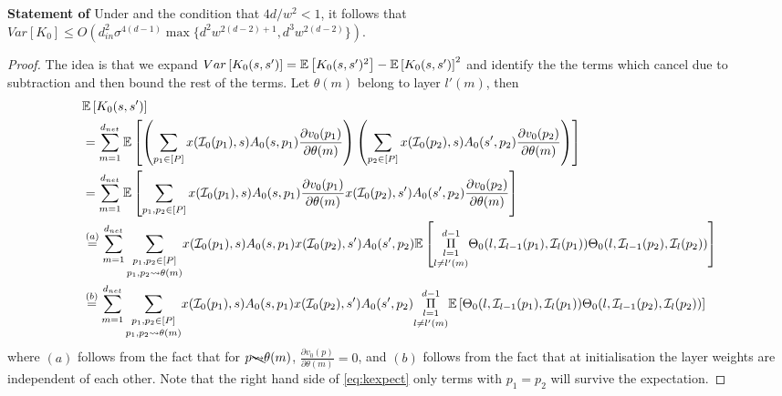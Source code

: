 \textbf{Statement of }
Under  and the condition that ${4d}/{w^2}<1$, it follows that\hfill\\
$Var\left[K_0\right]\leq O\left(d^2_{in}\sigma^{4(d-1)}\max\{d^2w^{2(d-2)+1}, d^3w^{2(d-2)}\}\right)$.
\begin{proof}
The idea is that we expand  $Var\left[K_0(s,s')\right]=\mathbb{E}\left[K_0(s,s')^2\right] -\mathbb{E}\left[K_0(s,s')\right]^2$ and identify the the terms which cancel due to subtraction and then bound the rest of the terms.%
 Let $\theta(m)$ belong to layer $l'(m)$, then 
\begin{align}\label{eq:kexpect}
&\mathbb{E}\left[K_0(s,s')\right]\nonumber\\
&=\sum_{m=1}^{d_{net}}\mathbb{E}\left[\left(\sum_{p_1 \in[P]}x(\mathcal{I}_0(p_1),s)A_0(s,p_1)\frac{\partial v_0(p_1)}{\partial \theta(m)}\right)\left(\sum_{p_2\in[P]}x(\mathcal{I}_0(p_2),s)A_0(s',p_2)\frac{\partial v_0(p_2)}{\partial \theta(m)}\right)\right]\nonumber\\
&=\sum_{m=1}^{d_{net}}\mathbb{E}\left[\sum_{p_1,p_2\in[P]}x(\mathcal{I}_0(p_1),s)A_0(s,p_1)\frac{\partial v_0(p_1)}{\partial \theta(m)}x(\mathcal{I}_0(p_2),s')A_0(s',p_2)\frac{\partial v_0(p_2)}{\partial \theta(m)}\right]\nonumber\\
&\stackrel{(a)}=\sum_{m=1}^{d_{net}}\underset{p_1,p_2\rightsquigarrow\theta(m)}{\sum_{p_1,p_2\in[P]}}x(\mathcal{I}_0(p_1),s)A_0(s,p_1)x(\mathcal{I}_0(p_2),s')A_0(s',p_2) \mathbb{E}\left[\underset{l\neq l'(m)}{\underset{l=1}{\overset{d-1}{\Pi}}} {\Theta}_0(l,\mathcal{I}_{l-1}(p_1),\mathcal{I}_{l}(p_1)) {\Theta}_0(l,\mathcal{I}_{l-1}(p_2),\mathcal{I}_{l}(p_2))\right]\nonumber\\
&\stackrel{(b)}=\sum_{m=1}^{d_{net}}\underset{p_1,p_2\rightsquigarrow\theta(m)}{\sum_{p_1,p_2\in[P]}}x(\mathcal{I}_0(p_1),s)A_0(s,p_1)x(\mathcal{I}_0(p_2),s')A_0(s',p_2) \underset{l\neq l'(m)}{\underset{l=1}{\overset{d-1}{\Pi}}} \mathbb{E}\left[{\Theta}_0(l,\mathcal{I}_{l-1}(p_1),\mathcal{I}_{l}(p_1)) {\Theta}_0(l,\mathcal{I}_{l-1}(p_2),\mathcal{I}_{l}(p_2))\right]
\end{align}
where $(a)$ follows from the fact that for $p\bcancel{\rightsquigarrow}\theta(m)$, $\frac{\partial v_0(p)}{\partial \theta(m)}=0$, and $(b)$ follows from the fact that at initialisation the layer weights are independent of each other. Note that the right hand side of \eqref{eq:kexpect} only terms with $p_1=p_2$ will survive the expectation.


\end{proof}

